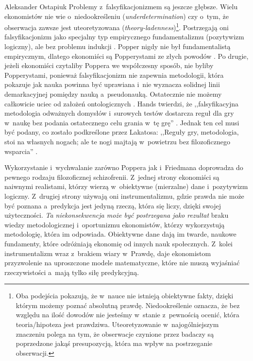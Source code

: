 \begin{artplenv}{Aleksander Ostapiuk}
Problemy z~falsyfikacjonizmem są jeszcze głębsze. Wielu ekonomistów nie wie o~niedookreśleniu
(\textit{underdetermination})
\parencite{quine_two_1951}
czy o~tym, że obserwacja zawsze jest
uteoretyzowana (\textit{theory-ladenness})\footnote{Oba podejścia pokazują, że w~nauce nie istnieją obiektywne fakty,
dzięki którym możemy poznać absolutną prawdę. Niedookreślenie oznacza, że bez względu na ilość dowodów nie jesteśmy
w~stanie z~pewnością ocenić, która teoria/hipoteza jest prawdziwa. Uteoretyzowanie w~najogólniejszym znaczeniu polega na
tym, że obserwacje czynione przez badaczy są poprzedzone jakąś presupozycją, która ma wpływ na postrzeganie obserwacji.}.
Postrzegają oni falsyfikacjonizm jako specjalny typ empirycznego fundamentalizmu (pozytywizm logiczny), ale bez
problemu indukcji
\parencite[s.~292]{hands_reflection_2001}.
Popper nigdy nie był fundamentalistą empirycznym,
dlatego ekonomiści są Popperystami ze złych powodów
\parencite[s.~292]{hands_reflection_2001}.
Po drugie, jeżeli
ekonomiści czytaliby Poppera we współczesny sposób, nie byliby Popperystami, ponieważ falsyfikacjonizm nie zapewnia
metodologii, która pokazuje jak nauka powinna być uprawiana i~nie wyznacza solidnej linii demarkacyjnej pomiędzy nauką
a~pseudonauką. Ostatecznie nie możemy całkowicie uciec od założeń ontologicznych
\parencite{kuhn_structure_1962,feyerabend_against_1975,mccloskey_rhetoric_1998,hands_reflection_2001}.
Hands twierdzi, że ,,falsyfikacyjna metodologia odważnych
domysłów i~surowych testów dostarcza reguł dla gry w~naukę bez podania ostatecznego celu grania w~tę grę''
\parencite[s.~293]{hands_reflection_2001}.
Jednak ten cel musi być podany, co zostało podkreślone przez Lakatosa:
,,Reguły gry, metodologia, stoi na własnych nogach; ale te nogi majtają w~powietrzu bez filozoficznego wsparcia''
\parencite[s.~154]{lakatos_methodology_1980}.

Wykorzystanie i~wychwalanie zarówno Poppera jak i~Friedmana doprowadza do pewnego rodzaju filozoficznej
schizofrenii. Z~jednej strony ekonomiści są naiwnymi realistami, którzy wierzą w~obiektywne (mierzalne)
dane i~pozytywizm logiczny. Z~drugiej strony używają oni instrumentalizmu,
gdzie prawda nie może być poznana a~predykcja jest jedyną rzeczą, która
się liczy, dzięki swojej użyteczności. \textit{Ta niekonsekwencja może być postrzegana jako rezultat} braku wiedzy
metodologicznej i~oportunizmu ekonomistów, którzy wykorzystują metodologię, która im odpowiada. Obiektywne dane dają im
twarde, naukowe fundamenty, które odróżniają ekonomię od innych nauk społecznych. Z~kolei instrumentalizm
wraz z~brakiem wiary w~Prawdę, daje ekonomistom przyzwolenie na uproszczone modele matematyczne,
które nie muszą wyjaśniać
rzeczywistości a~mają tylko siłę predykcyjną. 


\end{artplenv}
